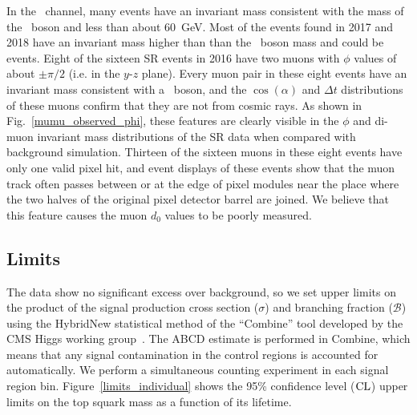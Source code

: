 In the \Pgm\Pgm\ channel, many events have an invariant mass consistent with the mass of the \cPZ\ boson and \ptmiss less than about \SI{60}{\GeV}. Most of the events found in 2017 and 2018 have an invariant mass higher than than the \cPZ\ boson mass and could be \ttbar events. Eight of the sixteen SR events in 2016 have two muons with $\phi$ values of about $\pm\pi/2$ (i.e. in the $y$-$z$ plane). Every muon pair in these eight events have an invariant mass consistent with a \cPZ\ boson, and the $\cos(\alpha)$ and $\Delta t$ distributions of these muons confirm that they are not from cosmic rays. As shown in Fig.~\ref{mumu_observed_phi}, these features are clearly visible in the $\phi$ and di-muon invariant mass distributions of the SR data when compared with background simulation. Thirteen of the sixteen muons in these eight events have only one valid pixel hit, and event displays of these events show that the muon track often passes between or at the edge of pixel modules near the place where the two halves of the original pixel detector barrel are joined. We believe that this feature causes the muon $d_0$ values to be poorly measured.



\subsection{Limits}
\label{limits}
The data show no significant excess over background, so we set upper limits on the product of the signal production cross section ($\sigma$) and branching fraction ($\mathcal{B}$) using the HybridNew statistical method of the ``Combine'' tool developed by the CMS Higgs working group~\cite{Junk_CLS,Read_CLS,Cowan:2010js,CMS-NOTE-2011-005}. The ABCD estimate is performed in Combine, which means that any signal contamination in the control regions is accounted for automatically. We perform a simultaneous counting experiment in each signal region bin. Figure~\ref{limits_individual} shows the 95\% confidence level ($\text{CL}$) upper limits on the top squark mass as a function of its lifetime.

